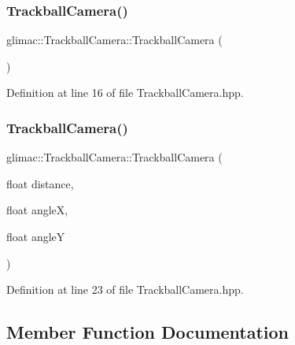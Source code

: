 \subsubsection{\texorpdfstring{Trackball\+Camera()}{TrackballCamera()}\hspace{0.1cm}{\footnotesize\ttfamily [1/2]}}
{\footnotesize\ttfamily glimac\+::\+Trackball\+Camera\+::\+Trackball\+Camera (\begin{DoxyParamCaption}{ }\end{DoxyParamCaption})\hspace{0.3cm}{\ttfamily [inline]}}



Definition at line 16 of file Trackball\+Camera.\+hpp.

\mbox{\label{classglimac_1_1_trackball_camera_af288f1fb23e598ea198b0b666c55e2bd}} 
\subsubsection{\texorpdfstring{Trackball\+Camera()}{TrackballCamera()}\hspace{0.1cm}{\footnotesize\ttfamily [2/2]}}
{\footnotesize\ttfamily glimac\+::\+Trackball\+Camera\+::\+Trackball\+Camera (\begin{DoxyParamCaption}\item[{float}]{distance,  }\item[{float}]{angleX,  }\item[{float}]{angleY }\end{DoxyParamCaption})\hspace{0.3cm}{\ttfamily [inline]}}



Definition at line 23 of file Trackball\+Camera.\+hpp.



\subsection{Member Function Documentation}
\mbox{\label{classglimac_1_1_trackball_camera_ab78f1303ef06065a639e383be767b7ba}} 
